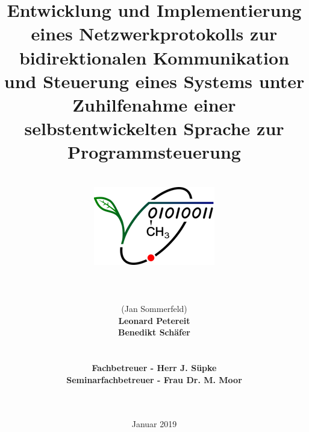 \documentclass[12pt,a4paper]{scrartcl}
\begin{document}
\title{Entwicklung und Implementierung eines Netzwerkprotokolls zur bidirektionalen Kommunikation und Steuerung eines Systems unter Zuhilfenahme einer selbstentwickelten Sprache zur Programmsteuerung}
\date{Januar 2019}
\author{\hfill\\
\includegraphics[scale=2.5]{logo}\hfill\\\hfill\\\hfill\\\hfill\\(Jan Sommerfeld)\\\textbf{Leonard Petereit}\\\textbf{Benedikt Schäfer}\\\hfill\\\hfill\\
\textbf{Fachbetreuer - Herr J. Süpke}\\
\textbf{Seminarfachbetreuer - Frau Dr. M. Moor}
\hfill\\\hfill\\\hfill\\
}
\maketitle
\newpage
\tableofcontents

\newpage

\newpage


\newpage


\newpage


\newpage

\end{document}
